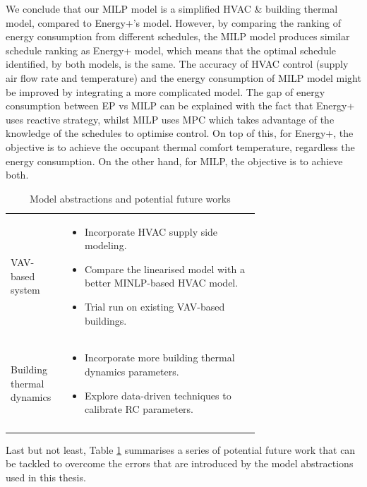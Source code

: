 We conclude that our MILP model is a simplified HVAC \& building thermal model, compared to Energy+'s model. However, by comparing the ranking of energy consumption from different schedules, the MILP model produces similar schedule ranking as Energy+ model, which means that the optimal schedule identified, by both models, is the same. The accuracy of HVAC control (supply air flow rate and temperature)  and the energy consumption of MILP model might be improved by integrating a more complicated model.
The gap of energy consumption between EP vs MILP can be explained with the fact that Energy+ uses reactive strategy, whilst MILP uses MPC which takes advantage of the knowledge of the schedules to optimise control. On top of this, for Energy+, the objective is to achieve the occupant thermal comfort temperature, regardless the energy consumption. On the other hand, for MILP, the objective is to achieve both.


\begin{table}[ht]
\centering
\small
\begin{tabular}{p{0.1\linewidth} p{0.6\linewidth}}
\hline \centering{\textbf{Model}} & \centering{\textbf{Future Work}} \tabularnewline
\hline \vspace{1ex} VAV-based system & 
\begin{itemize}	
	\item Incorporate HVAC supply side modeling.
	\item Compare the linearised model with a better MINLP-based HVAC model.
	\item Trial run on existing VAV-based buildings.
\end{itemize}
\tabularnewline
\hline \vspace{1ex} Building thermal dynamics &
\begin{itemize}
	\item Incorporate more building thermal dynamics parameters.
	\item Explore data-driven techniques to calibrate RC parameters.	
\end{itemize}
 \tabularnewline
\tabularnewline
\end{tabular}
\normalsize
	\caption{Model abstractions and potential future works}
	\label{tab:future}
\end{table}

Last but not least, Table \ref{tab:future} summarises a series of potential future work that can be tackled to overcome the errors that are introduced by the model abstractions used in this thesis.


